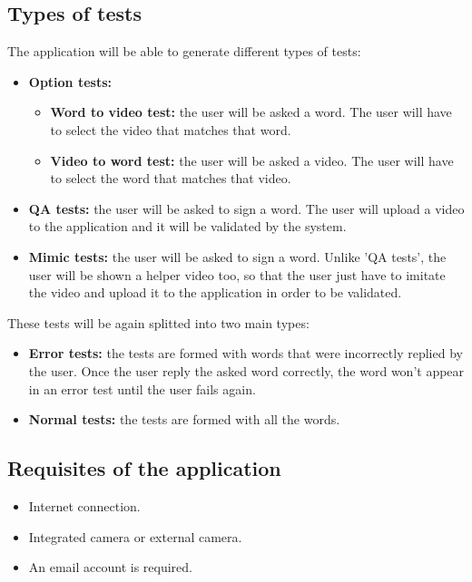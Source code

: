 \subsection{Types of tests}
The application will be able to generate different types of tests:
\begin{itemize}
    \item \textbf{Option tests:}
        \begin{itemize}
            \item \textbf{Word to video test:} the user will be asked a word. The user will have to select the video that matches that word.
            \item \textbf{Video to word test:} the user will be asked a video. The user will have to select the word that matches that video.
        \end{itemize}
    \item \textbf{QA tests:} the user will be asked to sign a word. The user will upload a video to the application and it will be validated by the system.
    \item \textbf{Mimic tests:} the user will be asked to sign a word. Unlike 'QA tests', the user will be shown a helper video too, so that the user just have to imitate the video and upload it to the application in order to be validated.
\end{itemize}

These tests will be again splitted into two main types:
\begin{itemize}
    \item \textbf{Error tests:} the tests are formed with words that were incorrectly replied by the user. Once the user reply the asked word correctly, the word won't appear in an error test until the user fails again.
    \item \textbf{Normal tests:} the tests are formed with all the words.
\end{itemize}

\subsection{Requisites of the application}
\begin{itemize}
    \item Internet connection.
    \item Integrated camera or external camera.
    \item An email account is required.
\end{itemize}


